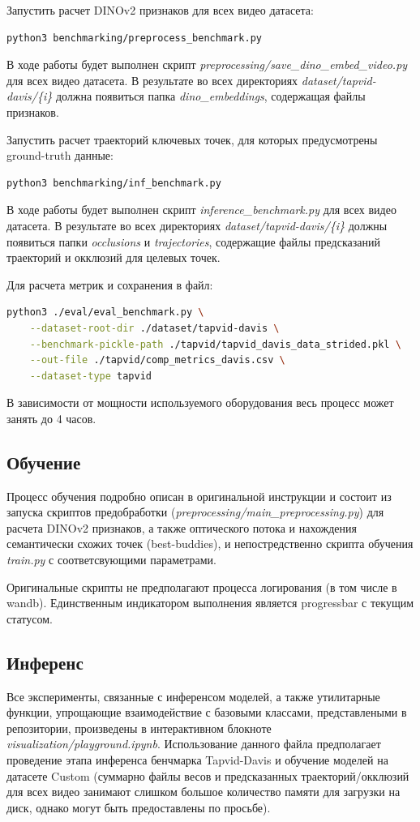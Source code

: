 \documentclass[a4paper, 14pt]{extarticle}
\theoremstyle{definition}
\theoremstyle{plain}
\theoremstyle{remark}
\begin{document}
Запустить расчет DINOv2 признаков для всех видео датасета:
\begin{lstlisting}[language=bash]
python3 benchmarking/preprocess_benchmark.py
\end{lstlisting}
В ходе работы будет выполнен скрипт \textit{preprocessing/save\_dino\_embed\_video.py} для всех видео датасета. В результате во всех директориях \textit{dataset/tapvid-davis/\{i\}} должна появиться папка \textit{dino\_embeddings}, содержащая файлы признаков.

Запустить расчет траекторий ключевых точек, для которых предусмотрены ground-truth данные:
\begin{lstlisting}[language=bash]
python3 benchmarking/inf_benchmark.py
\end{lstlisting}
В ходе работы будет выполнен скрипт \textit{inference\_benchmark.py} для всех видео датасета. В результате во всех директориях \textit{dataset/tapvid-davis/\{i\}} должны появиться папки \textit{occlusions} и \textit{trajectories}, содержащие файлы предсказаний траекторий и окклюзий для целевых точек.

Для расчета метрик и сохранения в файл:
\begin{lstlisting}[language=bash]
python3 ./eval/eval_benchmark.py \
    --dataset-root-dir ./dataset/tapvid-davis \
    --benchmark-pickle-path ./tapvid/tapvid_davis_data_strided.pkl \
    --out-file ./tapvid/comp_metrics_davis.csv \
    --dataset-type tapvid 
\end{lstlisting}

В зависимости от мощности используемого оборудования весь процесс может занять до 4 часов.

\subsection{Обучение}
Процесс обучения подробно описан в оригинальной инструкции и состоит из запуска скриптов предобработки (\textit{preprocessing/main\_preprocessing.py}) для расчета DINOv2 признаков, а также оптического потока и нахождения семантически схожих точек (best-buddies), и непостредственно скрипта обучения \textit{train.py} с соответсвующими параметрами.

Оригинальные скрипты не предполагают процесса логирования (в том числе в wandb). Единственным индикатором выполнения является progressbar с текущим статусом.

\subsection{Инференс}
Все эксперименты, связанные с инференсом моделей, а также утилитарные функции, упрощающие взаимодействие с базовыми классами, представлеными в репозитории, произведены в интерактивном блокноте \\ \textit{visualization/playground.ipynb}. Использование данного файла предполагает проведение этапа инференса бенчмарка Tapvid-Davis и обучение моделей на датасете Custom (суммарно файлы весов и предсказанных траекторий/окклюзий для всех видео занимают слишком большое количество памяти для загрузки на диск, однако могут быть предоставлены по просьбе).
\end{document}
